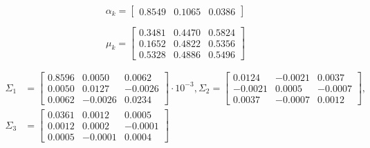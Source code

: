 \documentclass{ethz_report}
\begin{document}
\begin{equation}
    \alpha_k = \begin{bmatrix}
        0.8549 & 0.1065 & 0.0386
    \end{bmatrix}
\end{equation}

\begin{equation}
    \mu_k = \begin{bmatrix}
        0.3481  &  0.4470  &  0.5824 \\
        0.1652  &  0.4822  &  0.5356 \\
        0.5328  &  0.4886  &  0.5496
    \end{bmatrix}
\end{equation}

\begin{equation}
    \begin{split}
        \Sigma_1&= \begin{bmatrix}
            0.8596 &  0.0050 &  0.0062 \\
            0.0050 &  0.0127 & -0.0026 \\
            0.0062 & -0.0026 &  0.0234
        \end{bmatrix} \cdot 10^{-3},
        \Sigma_2 = \begin{bmatrix}
            0.0124 & -0.0021 &  0.0037 \\
            -0.0021 &  0.0005 & -0.0007 \\
            0.0037 & -0.0007 &  0.0012
        \end{bmatrix}, \\
        \Sigma_3&= \begin{bmatrix}
            0.0361 &  0.0012 &  0.0005 \\
            0.0012 &  0.0002 & -0.0001 \\
            0.0005 & -0.0001 &  0.0004
        \end{bmatrix}
    \end{split}
\end{equation}
\end{document}
